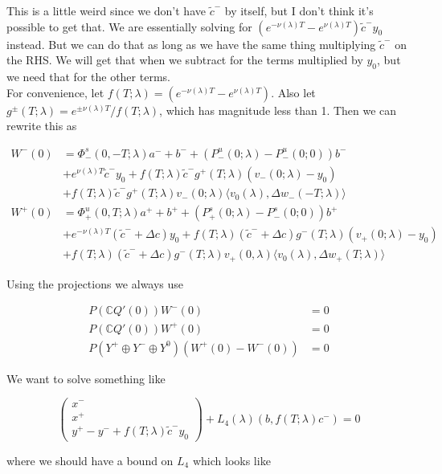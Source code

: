\documentclass[12pt]{article}
\def\C{{\mathbb C}}
\begin{document}
\begin{enumerate}
This is a little weird since we don't have $\tilde{c}^-$ by itself, but I don't think it's possible to get that. We are essentially solving for $(e^{-\nu(\lambda)T} - e^{\nu(\lambda)T}) \tilde{c}^- y_0$ instead. But we can do that as long as we have the same thing multiplying $\tilde{c}^-$ on the RHS. We will get that when we subtract for the terms multiplied by $y_0$, but we need that for the other terms.\\

For convenience, let $f(T; \lambda) = (e^{-\nu(\lambda)T} - e^{\nu(\lambda)T})$. Also let $g^\pm(T; \lambda) = e^{\pm \nu(\lambda)T} / f(T; \lambda)$, which has magnitude less than 1. Then we can rewrite this as

\begin{align*}
W^-(0) &= \Phi^s_-(0, -T; \lambda )a^- + b^- + (P^u_-(0; \lambda) - P^u_-(0; 0))b^- \\
&+ e^{\nu(\lambda)T} \tilde{c}^- y_0 + f(T; \lambda) \tilde{c}^- g^+(T; \lambda) ( v_-(0; \lambda) - y_0) \\
&+ f(T; \lambda)  \tilde{c}^- g^+(T; \lambda) v_-(0; \lambda) \langle  v_0(\lambda), \Delta w_-(-T; \lambda)\rangle \\
W^+(0) &= \Phi^u_+(0, T; \lambda)a^+ + b^+ + (P^s_+(0; \lambda) - P^s_-(0; 0))b^+ \\
&+ e^{-\nu(\lambda)T} (\tilde{c}^- + \Delta c) y_0 + f(T; \lambda)  (\tilde{c}^- + \Delta c) g^-(T; \lambda) ( v_+(0; \lambda) - y_0) \\
&+ f(T; \lambda)  (\tilde{c}^- + \Delta c) g^-(T; \lambda) v_+(0, \lambda) \langle  v_0(\lambda), \Delta w_+(T; \lambda)\rangle
\end{align*}

Using the projections we always use

\begin{align*}
P(\C Q'(0))W^-(0) &= 0 \\
P(\C Q'(0))W^+(0) &= 0 \\
P(Y^+ \oplus Y^- \oplus Y^0) (W^+(0) - W^-(0) ) &= 0
\end{align*}

We want to solve something like

\[
\begin{pmatrix}x^- \\ x^+ \\ y^+ - y^- + f(T; \lambda) \tilde{c}^- y_0 \end{pmatrix} + L_4(\lambda)(b, f(T; \lambda) c^-) = 0
\]

where we should have a bound on $L_4$ which looks like


\end{enumerate}
\end{document}
